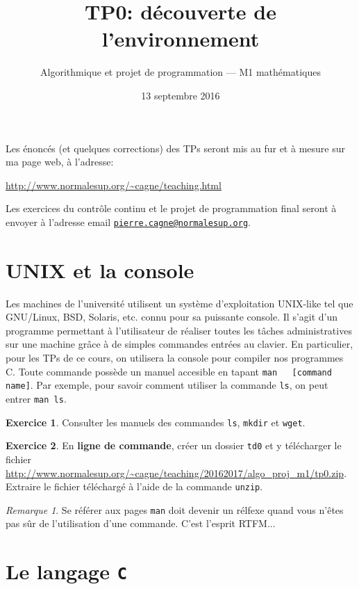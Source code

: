 \documentclass[10pt,french,a4paper]{article}
\title{\sffamily TP0: découverte de l'environnement}
\date{13 septembre 2016}
\author{Algorithmique et projet de programmation --- M1 mathématiques}
\theoremstyle{definition}
\newtheorem{exercise}{Exercice}
\theoremstyle{remark}
\newtheorem*{remark}{Remarque}
\newcommand{\shell}[1]{\lstinline[style=sh]|#1|}
\begin{document}
\maketitle

Les énoncés (et quelques corrections) des TPs seront mis au fur et à
mesure sur ma page web, à l'adresse:
\begin{center}
  \url{http://www.normalesup.org/~cagne/teaching.html}
\end{center}
Les exercices du contrôle continu et le projet de programmation final
seront à envoyer à l'adresse email
\href{mailto:pierre.cagne@normalesup.org}
{\nolinkurl{pierre.cagne@normalesup.org}}.

\section{UNIX et la console}
\label{sec:unix}

Les machines de l’université utilisent un système d’exploitation
UNIX-like tel que GNU/Linux, BSD, Solaris, etc. connu pour sa
puissante console. Il s’agit d’un programme permettant à l’utilisateur
de réaliser toutes les tâches administratives sur une machine grâce à
de simples commandes entrées au clavier. En particulier, pour les TPs
de ce cours, on utilisera la console pour compiler nos programmes C.
Toute commande possède un manuel accesible en tapant \shell{man
  [command name]}. Par exemple, pour savoir comment utiliser la
commande \shell{ls}, on peut entrer \shell{man ls}.
\begin{exercise}
  Consulter les manuels des commandes \shell{ls}, \shell{mkdir} et
  \shell{wget}.
\end{exercise}

\begin{exercise}
  En {\bf ligne de commande}, créer un dossier \shell{td0} et y
  télécharger le fichier{} 
  \url{http://www.normalesup.org/~cagne/teaching/20162017/algo_proj_m1/tp0.zip}. Extraire
  le fichier téléchargé à l'aide de la commande \shell{unzip}.
\end{exercise}

\begin{remark}
  Se référer aux pages \shell{man} doit devenir un rélfexe quand vous
  n'êtes pas sûr de l'utilisation d'une commande. C'est l'esprit
  RTFM...
\end{remark}

\section{Le langage {\tt C}}
\label{sec:c-lang}
\end{document}
